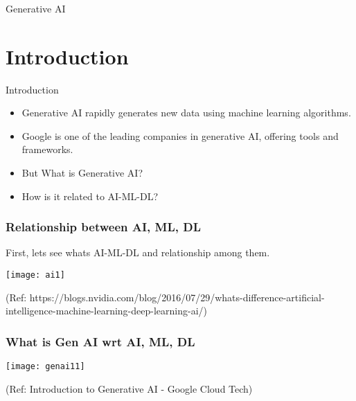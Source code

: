 \begin{frame}[fragile]\frametitle{}
\begin{center}
{\Large Generative AI}
\end{center}
\end{frame}

\section{Introduction}

\begin{frame}[fragile]{Introduction}
\begin{itemize}
\item Generative AI rapidly generates new data using machine learning algorithms.
\item Google is one of the leading companies in generative AI, offering tools and frameworks.
\item But What is Generative AI?
\item How is it related to AI-ML-DL?
\end{itemize}
\end{frame}

\begin{frame}[fragile]\frametitle{Relationship between AI, ML, DL}

First, lets see whats AI-ML-DL and relationship among them.

\begin{center}
\texttt{[image: ai1]}
\end{center}

{\tiny (Ref: https://blogs.nvidia.com/blog/2016/07/29/whats-difference-artificial-intelligence-machine-learning-deep-learning-ai/)}

\end{frame}

\begin{frame}[fragile]\frametitle{What is Gen AI wrt AI, ML, DL}

\begin{center}
\texttt{[image: genai11]}
\end{center}

{\tiny (Ref: Introduction to Generative AI - Google Cloud Tech)}

\end{frame}

